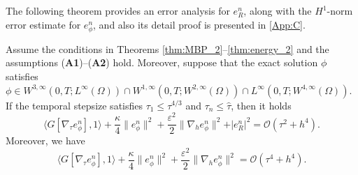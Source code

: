 \documentclass{m2an}
\newcommand{\mo}{\mathcal{O}}
\begin{document}
The following theorem provides an error analysis for $  e_{R}^{n} $, along with the $H^{1}$-norm error estimate for $ e_{\phi}^{n} $, and also its detail proof is presented in \ref{App:C}.
\begin{thrm}\label{thm:ErrR} 
	Assume the conditions in Theorems \ref{thm:MBP_2}--\ref{thm:energy_2} and the assumptions (\textbf{A1})--(\textbf{A2}) hold. Moreover, suppose that the exact solution $ \phi $ satisfies
	$
	\phi \in W^{3,\infty}(0,T;L^{\infty}(\Omega)) \cap W^{1,\infty}(0,T;W^{2,\infty}(\Omega)) \cap L^{\infty}(0,T;W^{4,\infty}(\Omega))
	$. If the temporal stepsize satisfies $ \tau_{1} \leq \tau^{4/3} $ and $\tau_{n} \leq  \hat{ \tau }$,
	then it holds  
	\begin{equation}\label{thmErrR:1}
		\big\langle G[ \nabla_{\tau} e_\phi^{n} ], 1 \big\rangle + \frac{\kappa}{4} \| e_\phi^{n} \|^2 + \frac{\varepsilon^2 }{2} \| \nabla_{h} e_\phi^{n} \|^2 + \vert e_R^{n} \vert^2 =\mo ( \tau^2 + h^4 ).
	\end{equation}
	Moreover, we have
	\begin{equation}\label{thmErrR:2}
		\big\langle G[ \nabla_{\tau} e_\phi^{n} ], 1 \big\rangle  + \frac{\kappa}{4} \| e_\phi^{n} \|^2 + \frac{\varepsilon^2 }{2} \| \nabla_{h} e_\phi^{n} \|^2 =\mo ( \tau^4 + h^4 ).
	\end{equation}
\end{thrm}


\end{document}
